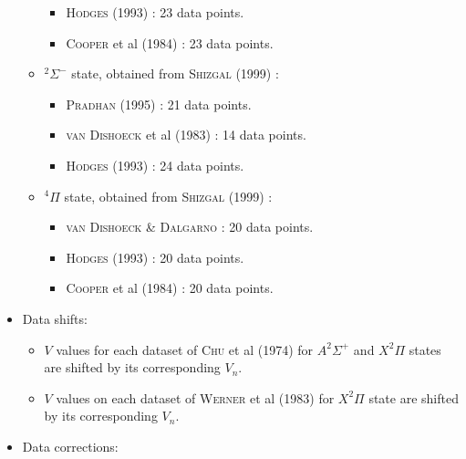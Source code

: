 \documentclass[12pt]{article}
\begin{document}
\begin{itemize}
\begin{itemize}
\begin{itemize}
            \item \textsc{Hodges} (1993) \cite{idx162}: 23 data points.
            \item \textsc{Cooper} et al (1984) \cite{idx165}: 23 data points.
        \end{itemize}
        \item $^2\Sigma^-$ state, obtained from \textsc{Shizgal} (1999) \cite{idx156}:
        \begin{itemize}
            \item \textsc{Pradhan} (1995) \cite{idx163}: 21 data points.
            \item \textsc{van Dishoeck} et al (1983) \cite{idx161}: 14 data points.
            \item \textsc{Hodges} (1993) \cite{idx162}: 24 data points.
        \end{itemize}
        \item $^4\Pi$ state, obtained from \textsc{Shizgal} (1999) \cite{idx156}:
        \begin{itemize}
            \item \textsc{van Dishoeck \& Dalgarno} \cite{idx164}: 20 data points.
            \item \textsc{Hodges} (1993) \cite{idx162}: 20 data points.
            \item \textsc{Cooper} et al (1984) \cite{idx165}: 20 data points. 
        \end{itemize}
    \end{itemize}
    \item Data shifts:
    \begin{itemize}
        \item $V$ values for each dataset of \textsc{Chu} et al (1974) \cite{idx159} for $A^2\Sigma^+$ and $X^2\Pi$ states are shifted by its corresponding $V_n$.
        \item $V$ values on each dataset of \textsc{Werner} et al (1983) \cite{idx171} for $X^2\Pi$ state are shifted by its corresponding $V_n$.
    \end{itemize}
    \item Data corrections:
    \begin{itemize}

        

\end{itemize}
\end{itemize}
\end{document}
